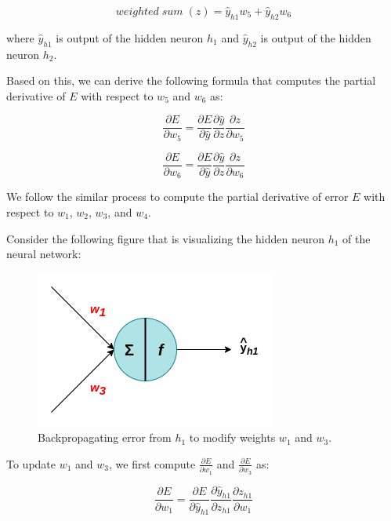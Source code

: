 \begin{equation}
    weighted\; sum\; (z) = \hat{y}_{h1} w_5 + \hat{y}_{h2} w_6
\end{equation}

where $\hat{y}_{h1}$ is output of the hidden neuron $h_1$ and $\hat{y}_{h2}$ is output of the hidden neuron $h_2$.

Based on this, we can derive the following formula that computes the partial derivative of $E$ with respect to $w_5$ and $w_6$ as:

\begin{equation}
    \frac{\partial E}{\partial w_5} = \frac{\partial E}{\partial \hat{y}} \frac{\partial \hat{y}}{\partial z} \frac{\partial z}{\partial w_5}
\end{equation}

\begin{equation}
    \frac{\partial E}{\partial w_6} = \frac{\partial E}{\partial \hat{y}} \frac{\partial \hat{y}}{\partial z} \frac{\partial z}{\partial w_6}
\end{equation}

We follow the similar process to compute the partial derivative of error $E$ with respect to $w_1$, $w_2$, $w_3$, and $w_4$.

Consider the following figure that is visualizing the hidden neuron $h_1$ of the neural network:
\begin{figure}[h]
	\centering
	\includegraphics[width=0.4\linewidth]{images/background/back_prop_2.png}
	\caption[Backpropagating error from $h_1$]%
	{Backpropagating error from $h_1$ to modify weights $w_1$ and $w_3$.}
	\label{fig:back_prop_2}
\end{figure}

To update $w_1$ and $w_3$, we first compute $\frac{\partial E}{\partial w_1}$ and $\frac{\partial E}{\partial w_3}$ as:

\begin{equation}
    \frac{\partial E}{\partial w_1} = \frac{\partial E}{\partial \hat{y}_{h1}} \frac{\partial \hat{y}_{h1}}{\partial z_{h1}} \frac{\partial z_{h1}}{\partial w_1}
\end{equation}


